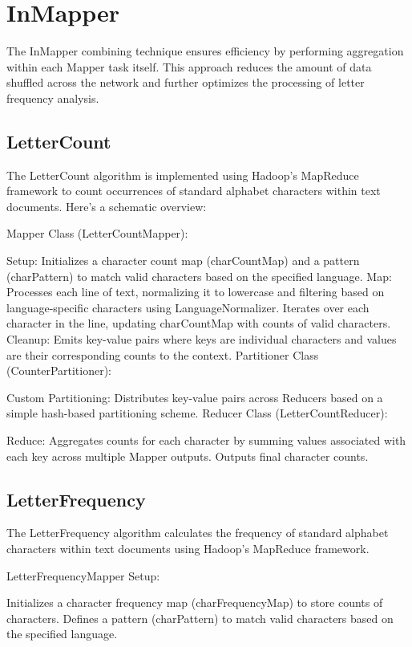 \section{InMapper}
The InMapper combining technique ensures efficiency by performing aggregation within each Mapper task itself. This approach reduces the amount of data shuffled across the network and further optimizes the processing of letter frequency analysis.


\subsection{LetterCount}

The LetterCount algorithm is implemented using Hadoop's MapReduce framework to count occurrences of standard alphabet characters within text documents. Here’s a schematic overview:

Mapper Class (LetterCountMapper):

Setup:
Initializes a character count map (charCountMap) and a pattern (charPattern) to match valid characters based on the specified language.
Map:
Processes each line of text, normalizing it to lowercase and filtering based on language-specific characters using LanguageNormalizer.
Iterates over each character in the line, updating charCountMap with counts of valid characters.
Cleanup:
Emits key-value pairs where keys are individual characters and values are their corresponding counts to the context.
Partitioner Class (CounterPartitioner):

Custom Partitioning:
Distributes key-value pairs across Reducers based on a simple hash-based partitioning scheme.
Reducer Class (LetterCountReducer):

Reduce:
Aggregates counts for each character by summing values associated with each key across multiple Mapper outputs.
Outputs final character counts.

\subsection{LetterFrequency}
The LetterFrequency algorithm calculates the frequency of standard alphabet characters within text documents using Hadoop's MapReduce framework.

LetterFrequencyMapper
Setup:

Initializes a character frequency map (charFrequencyMap) to store counts of characters.
Defines a pattern (charPattern) to match valid characters based on the specified language.

